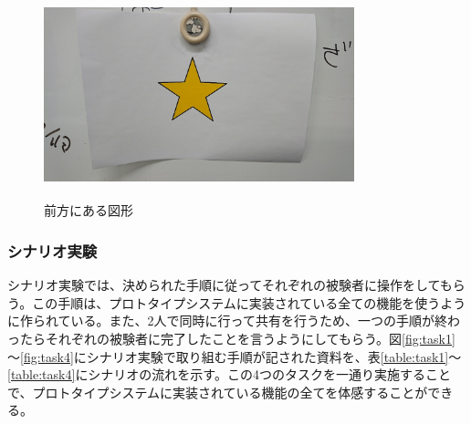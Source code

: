 \documentclass[11pt,a4j, titlepage]{jarticle} %
\begin{document}
\begin{figure}[H]
  \begin{center}
    \includegraphics[clip,height=6.0cm,width=9.0cm]{./hoshi.eps}
    \caption{前方にある図形}
    \label{fig:hoshi}
  \end{center}
\end{figure}

\subsubsection{シナリオ実験}
シナリオ実験では、決められた手順に従ってそれぞれの被験者に操作をしてもらう。この手順は、プロトタイプシステムに実装されている全ての機能を使うように作られている。また、2人で同時に行って共有を行うため、一つの手順が終わったらそれぞれの被験者に完了したことを言うようにしてもらう。図\ref{fig:task1}～\ref{fig:task4}にシナリオ実験で取り組む手順が記された資料を、表\ref{table:task1}～\ref{table:task4}にシナリオの流れを示す。この4つのタスクを一通り実施することで、プロトタイプシステムに実装されている機能の全てを体感することができる。
\end{document}
